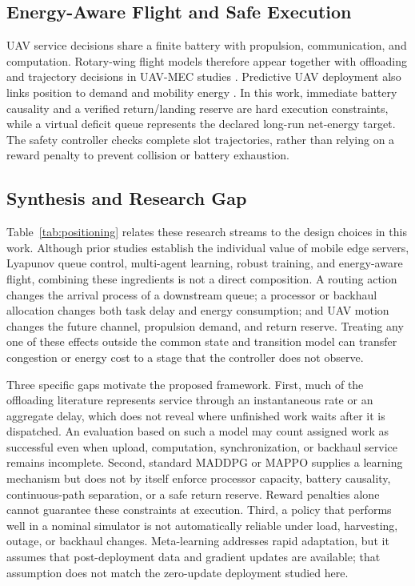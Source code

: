 \subsection{Energy-Aware Flight and Safe Execution}
UAV service decisions share a finite battery with propulsion, communication,
and computation. Rotary-wing flight models therefore appear together with
offloading and trajectory decisions in UAV-MEC studies
\cite{liu2020uav,talukdar2026mappo}. Predictive UAV deployment also links
position to demand and mobility energy \cite{zhang2019predictive}. In this
work, immediate battery causality and a verified return/landing reserve are
hard execution constraints, while a virtual deficit queue represents the
declared long-run net-energy target. The safety controller checks complete
slot trajectories, rather than relying on a reward penalty to prevent
collision or battery exhaustion.

\subsection{Synthesis and Research Gap}
Table~\ref{tab:positioning} relates these research streams to the design
choices in this work. Although prior studies establish the individual value of
mobile edge servers, Lyapunov queue control, multi-agent learning, robust
training, and energy-aware flight, combining these ingredients is not a direct
composition. A routing action changes the arrival process of a downstream
queue; a processor or backhaul allocation changes both task delay and energy
consumption; and UAV motion changes the future channel, propulsion demand, and
return reserve. Treating any one of these effects outside the common state and
transition model can transfer congestion or energy cost to a stage that the
controller does not observe.

Three specific gaps motivate the proposed framework. First, much of the
offloading literature represents service through an instantaneous rate or an
aggregate delay, which does not reveal where unfinished work waits after it is
dispatched. An evaluation based on such a model may count assigned work as
successful even when upload, computation, synchronization, or backhaul service
remains incomplete. Second, standard MADDPG or MAPPO supplies a learning
mechanism but does not by itself enforce processor capacity, battery causality,
continuous-path separation, or a safe return reserve. Reward penalties alone
cannot guarantee these constraints at execution. Third, a policy that performs
well in a nominal simulator is not automatically reliable under load,
harvesting, outage, or backhaul changes. Meta-learning addresses rapid
adaptation, but it assumes that post-deployment data and gradient updates are
available; that assumption does not match the zero-update deployment studied
here.


